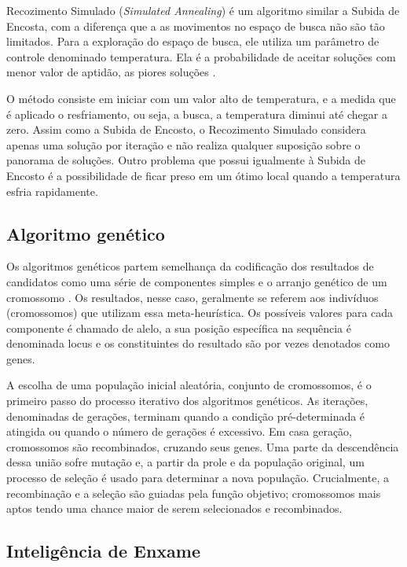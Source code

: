 Recozimento Simulado (\textit{Simulated Annealing}) é um algoritmo similar a Subida de Encosta, com a diferença que a as movimentos no espaço de busca não são tão limitados. Para a exploração do espaço de busca, ele utiliza um parâmetro de controle denominado temperatura. Ela é a probabilidade de aceitar soluções com menor valor de aptidão, as piores soluções \cite{kirkpatrick1983optimization}.

O método consiste em iniciar com um valor alto de temperatura, e a medida que é aplicado o resfriamento, ou seja, a busca, a temperatura diminui até chegar a zero. Assim como a Subida de Encosto, o Recozimento Simulado considera apenas uma solução por iteração e não realiza qualquer suposição sobre o panorama de soluções. Outro problema que possui igualmente à Subida de Encosto é a possibilidade de ficar preso em um ótimo local quando a temperatura esfria rapidamente.

\subsection{Algoritmo genético}

Os algoritmos genéticos partem semelhança da codificação dos resultados de candidatos como uma série de componentes simples e o arranjo genético de um cromossomo \cite{alander1998genetic}. Os resultados, nesse caso, geralmente se referem aos indivíduos (cromossomos) que utilizam essa meta-heurística. Os possíveis valores para cada componente é chamado de alelo, a sua posição específica na sequência é denominada locus e os constituintes do resultado são por vezes denotados como genes.

A escolha de uma população inicial aleatória, conjunto de cromossomos, é o primeiro passo do processo iterativo dos algoritmos genéticos. As iterações, denominadas de gerações, terminam quando a condição pré-determinada é atingida ou quando o número de gerações é excessivo. Em casa geração, cromossomos são recombinados, cruzando seus genes. Uma parte da descendência dessa união sofre mutação e, a partir da prole e da população original, um processo de seleção é usado para determinar a nova população. Crucialmente, a recombinação e a seleção são guiadas pela função objetivo; cromossomos mais aptos tendo uma chance maior de serem selecionados e recombinados.

\subsection{Inteligência de Enxame}

